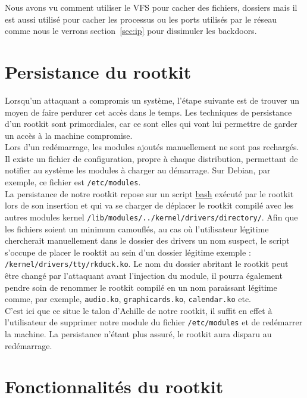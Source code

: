 \documentclass[12pt]{article}
\begin{document}
Nous avons vu comment utiliser le VFS pour cacher des fichiers, dossiers mais il est aussi utilisé pour cacher les processus ou les ports utilisés par le réseau comme nous le verrons section~\ref{sec:ip} pour dissimuler les backdoors.

\section{Persistance du rootkit}

    Lorsqu'un attaquant a compromis un système, l'étape suivante est de trouver un moyen de faire perdurer cet accès dans le temps. Les techniques de persistance d'un rootkit sont primordiales, car ce sont elles qui vont lui permettre de garder un accès à la machine compromise. \\ 

    Lors d'un redémarrage, les modules ajoutés manuellement ne sont pas rechargés. Il existe un fichier de configuration, propre à chaque distribution, permettant de notifier au système les modules à charger au démarrage. Sur Debian, par exemple, ce fichier est \texttt{/etc/modules}. \\

    La persistance de notre rootkit repose sur un script \href{https://github.com/QuokkaLight/rkduck/blob/master/forever.sh}{bash} exécuté par le rootkit lors de son insertion et qui va se charger de déplacer le rootkit compilé avec les autres modules kernel \texttt{/lib/modules/../kernel/drivers/directory/}. Afin que les fichiers soient un minimum camouflés, au cas où l'utilisateur légitime chercherait manuellement dans le dossier des drivers un nom suspect, le script s'occupe de placer le rooktit au sein d'un dossier légitime exemple : \texttt{/kernel/drivers/tty/rkduck.ko}. Le nom du dossier abritant le rootkit peut être changé par l'attaquant avant l'injection du module, il pourra également pendre soin de renommer le rootkit compilé en un nom paraissant légitime comme, par exemple, \texttt{audio.ko}, \texttt{graphicards.ko}, \texttt{calendar.ko} etc. \\

    C'est ici que ce situe le talon d'Achille de notre rootkit, il suffit en effet à l'utilisateur de supprimer notre module du fichier \texttt{/etc/modules} et de redémarrer la machine. La persistance n'étant plus assuré, le rootkit aura disparu au redémarrage.

\section{Fonctionnalités du rootkit}
    
\end{document}

